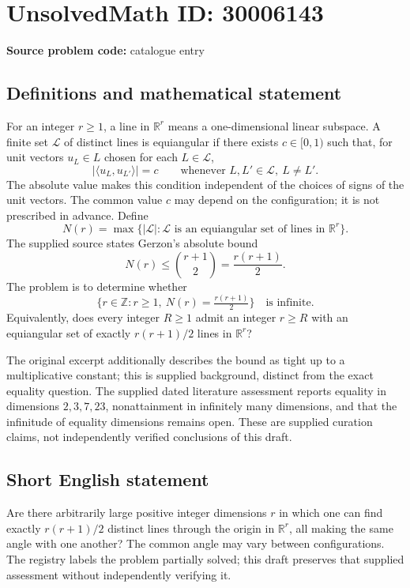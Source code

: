 \documentclass[11pt]{article}
\newcommand{\Z}{\mathbb{Z}}
\newcommand{\R}{\mathbb{R}}
\begin{document}
\section*{UnsolvedMath ID: 30006143}
\textbf{Source problem code:} catalogue entry
\subsection{Definitions and mathematical statement}
For an integer \(r\geq 1\), a line in \(\R^r\) means a one-dimensional linear subspace. A finite set \(\mathcal L\) of distinct lines is equiangular if there exists \(c\in[0,1)\) such that, for unit vectors \(u_L\in L\) chosen for each \(L\in\mathcal L\),
\[
\lvert\langle u_L,u_{L'}\rangle\rvert=c
\qquad\text{whenever }L,L'\in\mathcal L,\ L\ne L'.
\]
The absolute value makes this condition independent of the choices of signs of the unit vectors. The common value \(c\) may depend on the configuration; it is not prescribed in advance. Define
\[
N(r)=\max\{\lvert\mathcal L\rvert:\mathcal L\text{ is an equiangular set of lines in }\R^r\}.
\]
The supplied source states Gerzon's absolute bound
\[
N(r)\leq\binom{r+1}{2}=\frac{r(r+1)}2.
\]
The problem is to determine whether
\[
\bigl\{r\in\Z:r\geq1,\ N(r)=\tfrac{r(r+1)}2\bigr\}
\quad\text{is infinite}.
\]
Equivalently, does every integer \(R\geq1\) admit an integer \(r\geq R\) with an equiangular set of exactly \(r(r+1)/2\) lines in \(\R^r\)?

The original excerpt additionally describes the bound as tight up to a multiplicative constant; this is supplied background, distinct from the exact equality question. The supplied dated literature assessment reports equality in dimensions \(2,3,7,23\), nonattainment in infinitely many dimensions, and that the infinitude of equality dimensions remains open. These are supplied curation claims, not independently verified conclusions of this draft.
\subsection{Short English statement}
Are there arbitrarily large positive integer dimensions \(r\) in which one can find exactly \(r(r+1)/2\) distinct lines through the origin in \(\R^r\), all making the same angle with one another? The common angle may vary between configurations. The registry labels the problem partially solved; this draft preserves that supplied assessment without independently verifying it.
\end{document}
